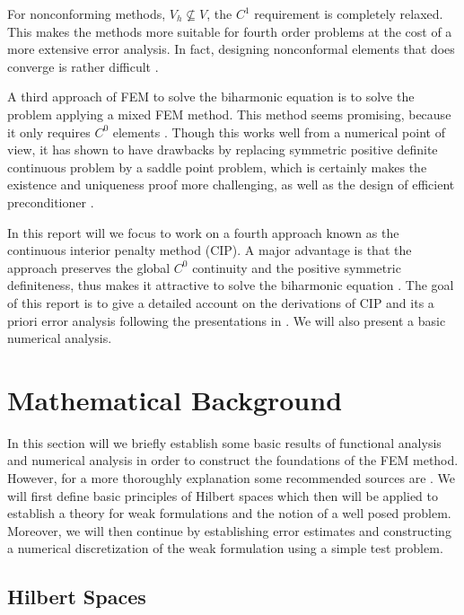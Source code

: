 For nonconforming methods, $V_{h} \not \subseteq  V$, the $C^{1}$ requirement is completely relaxed. This makes the methods more suitable for fourth order problems at the cost of a more extensive error analysis. In fact, designing nonconformal
elements that does converge is rather difficult \cite{shi02, nair21}.

A third approach of FEM to solve the biharmonic equation is to solve the problem applying a mixed FEM method. This method seems promising, because it only requires $C^{0}$ elements \cite{chen08, brezzi91}.
Though this works well from a numerical point of view, it has shown to have drawbacks by replacing symmetric positive definite continuous problem
by a saddle point problem, which is certainly makes the existence and uniqueness proof more challenging, as well as the design of efficient preconditioner \cite{brezzi74}.

In this report will we focus to work on a fourth approach known as the continuous interior penalty method (CIP). A major advantage is that the approach preserves the global $C^{0}$ continuity and the positive symmetric definiteness, thus makes it
attractive to solve the biharmonic equation \cite{brenner2012, brenner2012quadratic}. The goal of this report is to give a detailed account on the derivations of CIP and its a priori error analysis following the presentations in \cite{gu2012c0,
brenner2012}. We will also present a basic numerical analysis.


\section{Mathematical Background}%
\label{sub:mathematical_background}

In this section will we briefly establish some basic results of functional analysis and numerical analysis in order to construct the foundations of the FEM method. However, for a more thoroughly explanation some recommended sources are
\cite{brenner07math,manzoni2021optimal, quartdiff}. We will first define basic principles of Hilbert spaces which then will be applied to establish a theory for weak formulations and the notion of a well posed problem. Moreover, we will then continue by
establishing error estimates and constructing a numerical discretization of the weak formulation using a simple test problem.

\subsection{Hilbert Spaces}%
\label{sub:hilbert_spaces}

